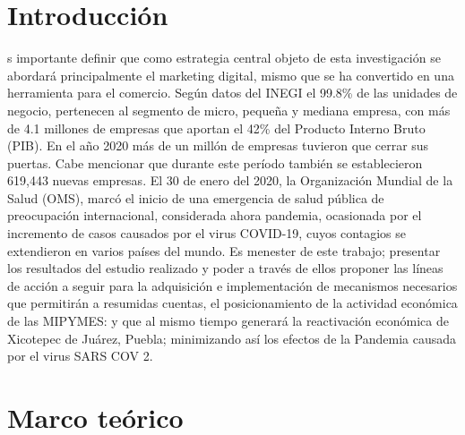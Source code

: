 \documentclass[12pt]{difu100cia} %
\begin{document}
\section{Introducción}
s importante definir que como estrategia central objeto de esta investigación se abordará principalmente el marketing digital, mismo que se ha convertido en una herramienta para el comercio.
Según datos del INEGI el 99.8\% de las unidades de negocio, pertenecen al segmento de micro, pequeña y mediana empresa, con más de 4.1 millones de empresas que aportan el 42\% del Producto Interno Bruto (PIB).
En el año 2020 más de un millón de empresas tuvieron que cerrar sus puertas. Cabe mencionar que durante este período también se establecieron 619,443 nuevas empresas.
El 30 de enero del 2020, la Organización Mundial de la Salud (OMS), marcó el inicio de una emergencia de salud pública de preocupación internacional, considerada ahora pandemia, ocasionada por el incremento de casos causados por el virus COVID-19, cuyos contagios se extendieron en varios países del mundo.
Es menester de este trabajo; presentar los resultados del estudio realizado y poder a través de ellos proponer las líneas de acción a seguir para la adquisición e implementación de mecanismos necesarios que permitirán a resumidas cuentas, el posicionamiento de la actividad económica de las MIPYMES: y que al mismo tiempo generará la reactivación económica de Xicotepec de Juárez, Puebla; minimizando así los efectos de la Pandemia causada por el virus SARS COV 2.

\section{Marco teórico}
\end{document}
